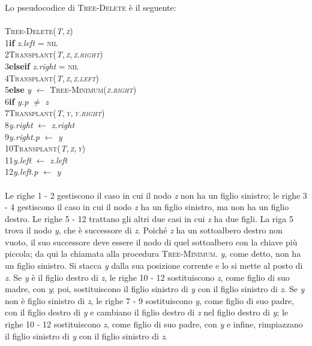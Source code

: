 \documentclass[10pt, a4paper]{report}
\newcommand\firsttab[1][0.5cm]{\hspace*{#1}}
\newcommand\secondtab[1][1cm]{\hspace*{#1}}
\newcommand\thirdtab[1][1.5cm]{\hspace*{#1}}
\begin{document}
Lo pseudocodice di \textsc{Tree-Delete} è il seguente:\\\\
\textsc{Tree-Delete(\textit{T},\,\textit{z})}\\
1\firsttab\textbf{if} \textit{z.left} = \textsc{nil}\\
2\secondtab\textsc{Transplant(\textit{T},\,\textit{z},\,\textit{z.right})}\\
3\firsttab\textbf{elseif} \textit{z.right} = \textsc{nil}\\
4\secondtab\textsc{Transplant(\textit{T},\,\textit{z},\,\textit{z.left})}\\
5\firsttab\textbf{else} \textit{y} $\leftarrow$ \textsc{Tree-Minimum(\textit{z.right})}\\
6\secondtab\textbf{if} \textit{y.p} $\not=$ \textit{z}\\
7\thirdtab\textsc{Transplant(\textit{T},\,\textit{y},\,\textit{y.right})}\\
8\thirdtab\textit{y.right} $\leftarrow$ \textit{z.right}\\
9\thirdtab\textit{y.right.p} $\leftarrow$ \textit{y}\\
10\secondtab\textsc{Transplant(\textit{T},\,\textit{z},\,\textit{y})}\\
11\secondtab\textit{y.left} $\leftarrow$ \textit{z.left}\\
12\secondtab\textit{y.left.p} $\leftarrow$ \textit{y}\\\\
Le righe 1 - 2 gestiscono il caso in cui il nodo \textit{z} non ha un figlio sinistro; le righe 3 - 4 gestiscono il caso in cui il nodo \textit{z} ha un figlio sinistro, ma non ha un figlio destro. Le righe 5 - 12 trattano gli altri due casi in cui \textit{z} ha due figli. La riga 5 trova il nodo \textit{y}, che è successore di \textit{z}. Poiché \textit{z} ha un sottoalbero destro non vuoto, il suo successore deve essere il nodo di quel sottoalbero con la chiave più piccola; da qui la chiamata alla procedura \textsc{Tree-Minimum}. \textit{y}, come detto, non ha un figlio sinistro. Si stacca \textit{y} dalla sua posizione corrente e lo si mette al posto di \textit{z}. Se \textit{y} è il figlio destro di \textit{z}, le righe 10 - 12 sostituiscono \textit{z}, come figlio di suo madre, con \textit{y}; poi, sostituiscono il figlio sinistro di \textit{y} con il figlio sinistro di \textit{z}. Se \textit{y} non è figlio sinistro di \textit{z}, le righe 7 - 9 sostituiscono \textit{y}, come figlio di suo padre, con il figlio destro di \textit{y} e cambiano il figlio destro di \textit{z} nel figlio destro di \textit{y}; le righe 10 - 12 sostituiscono \textit{z}, come figlio di suo padre, con \textit{y} e infine, rimpiazzano il figlio sinistro di \textit{y} con il figlio sinistro di \textit{z}.
\end{document}
